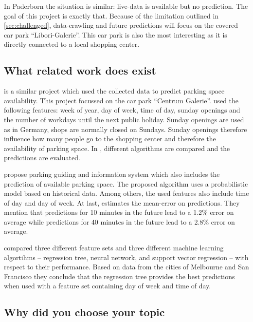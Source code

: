 \documentclass[journal,10pt]{IEEEtran}
\begin{document}
In Paderborn the situation is similar: live-data is available but no prediction. The goal of this project is exactly that. Because of the limitation outlined in \ref{sec:challenged}, data-crawling and future predictions will focus on the covered car park ``Libori-Galerie''. This car park is also the most interesting as it is directly connected to a local shopping center. 


\subsection{What related work does exist}
\cite{parkendd} is a similar project which used the collected data to predict parking space availability. This project focussed on the car park ``Centrum Galerie''. \cite{parkendd} used the following features: week of year, day of week, time of day, sunday openings and the number of workdays until the next public holiday. Sunday openings are used as in Germany, shops are normally closed on Sundays. Sunday openings therefore influence how many people go to the shopping center and therefore the availability of parking space. In \cite{parkendd}, different algorithms are compared and the predictions are evaluated.

\cite{Rajabioun2013} propose parking guiding and
information system which also includes the prediction of available parking space. The proposed algorithm uses a probabilistic model based on historical data. Among others, the used features also include time of day and day of week. At last, \cite{Rajabioun2013} estimates the mean-error on predictions. They mention that predictions for 10 minutes in the future lead to a 1.2\% error on average while predictions for 40 minutes in the future lead to a 2.8\% error on average.

\cite{Zheng2015} compared three different feature sets and three different machine learning algortihms -- regression tree, neural network, and support vector regression -- with respect to their performance. Based on data from the cities of Melbourne and San Francisco they conclude that the regression tree provides the best predictions when used with a feature set containing day of week and time of day.  

\subsection{Why did you choose your topic}
\end{document}
